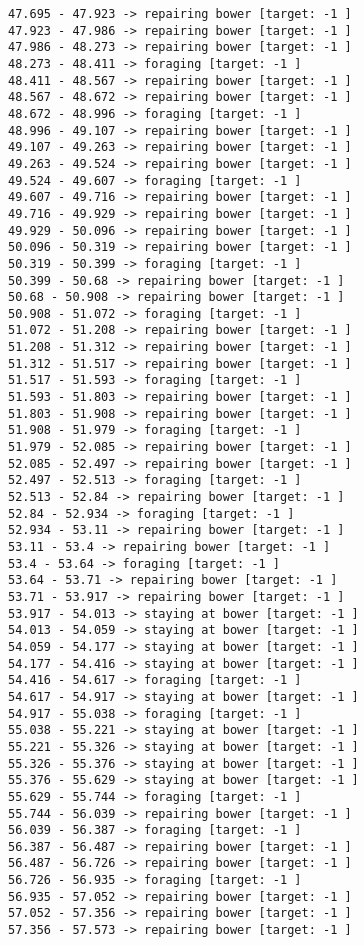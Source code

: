 \documentclass[11pt]{article}
\begin{document}
\begin{Verbatim}[commandchars=\\\{\}]
47.695 - 47.923 -> repairing bower [target: -1 ]
47.923 - 47.986 -> repairing bower [target: -1 ]
47.986 - 48.273 -> repairing bower [target: -1 ]
48.273 - 48.411 -> foraging [target: -1 ]
48.411 - 48.567 -> repairing bower [target: -1 ]
48.567 - 48.672 -> repairing bower [target: -1 ]
48.672 - 48.996 -> foraging [target: -1 ]
48.996 - 49.107 -> repairing bower [target: -1 ]
49.107 - 49.263 -> repairing bower [target: -1 ]
49.263 - 49.524 -> repairing bower [target: -1 ]
49.524 - 49.607 -> foraging [target: -1 ]
49.607 - 49.716 -> repairing bower [target: -1 ]
49.716 - 49.929 -> repairing bower [target: -1 ]
49.929 - 50.096 -> repairing bower [target: -1 ]
50.096 - 50.319 -> repairing bower [target: -1 ]
50.319 - 50.399 -> foraging [target: -1 ]
50.399 - 50.68 -> repairing bower [target: -1 ]
50.68 - 50.908 -> repairing bower [target: -1 ]
50.908 - 51.072 -> foraging [target: -1 ]
51.072 - 51.208 -> repairing bower [target: -1 ]
51.208 - 51.312 -> repairing bower [target: -1 ]
51.312 - 51.517 -> repairing bower [target: -1 ]
51.517 - 51.593 -> foraging [target: -1 ]
51.593 - 51.803 -> repairing bower [target: -1 ]
51.803 - 51.908 -> repairing bower [target: -1 ]
51.908 - 51.979 -> foraging [target: -1 ]
51.979 - 52.085 -> repairing bower [target: -1 ]
52.085 - 52.497 -> repairing bower [target: -1 ]
52.497 - 52.513 -> foraging [target: -1 ]
52.513 - 52.84 -> repairing bower [target: -1 ]
52.84 - 52.934 -> foraging [target: -1 ]
52.934 - 53.11 -> repairing bower [target: -1 ]
53.11 - 53.4 -> repairing bower [target: -1 ]
53.4 - 53.64 -> foraging [target: -1 ]
53.64 - 53.71 -> repairing bower [target: -1 ]
53.71 - 53.917 -> repairing bower [target: -1 ]
53.917 - 54.013 -> staying at bower [target: -1 ]
54.013 - 54.059 -> staying at bower [target: -1 ]
54.059 - 54.177 -> staying at bower [target: -1 ]
54.177 - 54.416 -> staying at bower [target: -1 ]
54.416 - 54.617 -> foraging [target: -1 ]
54.617 - 54.917 -> staying at bower [target: -1 ]
54.917 - 55.038 -> foraging [target: -1 ]
55.038 - 55.221 -> staying at bower [target: -1 ]
55.221 - 55.326 -> staying at bower [target: -1 ]
55.326 - 55.376 -> staying at bower [target: -1 ]
55.376 - 55.629 -> staying at bower [target: -1 ]
55.629 - 55.744 -> foraging [target: -1 ]
55.744 - 56.039 -> repairing bower [target: -1 ]
56.039 - 56.387 -> foraging [target: -1 ]
56.387 - 56.487 -> repairing bower [target: -1 ]
56.487 - 56.726 -> repairing bower [target: -1 ]
56.726 - 56.935 -> foraging [target: -1 ]
56.935 - 57.052 -> repairing bower [target: -1 ]
57.052 - 57.356 -> repairing bower [target: -1 ]
57.356 - 57.573 -> repairing bower [target: -1 ]

\end{Verbatim}
\end{document}
